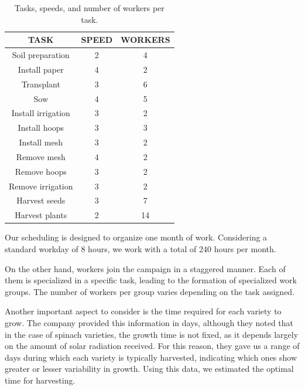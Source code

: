  \begin{table}[ht!]
    \centering
    \begin{minipage}{0.48\textwidth}
        \centering
        \begin{tabular}{|c|c|c|}
            \hline
            \rowcolor{gray!30} \textbf{\textcolor{grey3}{TASK}} & \textbf{\textcolor{grey3}{SPEED}} &  \textbf{\textcolor{grey3}{WORKERS}}\\\hline 
            \hline
            Soil preparation   & 2 & 4 \\ \hline
            Install paper      & 4 & 2\\ \hline
            Transplant         & 3 & 6\\ \hline
            Sow                & 4 & 5\\ \hline
            Install irrigation & 3 & 2 \\ \hline
            Install hoops      & 3 & 3 \\ \hline
            Install mesh       & 3 & 2 \\ \hline
            Remove mesh        & 4 & 2 \\ \hline
            Remove hoops       & 3 & 2 \\ \hline
            Remove irrigation  & 3 & 2 \\ \hline
            Harvest seeds      & 3 & 7 \\ \hline
            Harvest plants     & 2 & 14 \\ 
            \hline
        \end{tabular}
        \caption{Tasks, speeds, and number of workers per task.}
        \label{tab:tareas}
    \end{minipage}
    \hfill
\end{table}
Our scheduling is designed to organize one month of work. Considering a standard workday of 8 hours,  
we work with a total of 240 hours per month.

On the other hand, workers join the campaign in a staggered manner. Each of them is specialized in a specific task,  
leading to the formation of specialized work groups.  
The number of workers per group varies depending on the task assigned.

Another important aspect to consider is the time required for each variety to grow. The company provided this information in days,  
although they noted that in the case of spinach varieties, the growth time is not fixed, as it depends largely on the amount of solar radiation received.  
For this reason, they gave us a range of days during which each variety is typically harvested, indicating which ones show greater or lesser variability in growth.  
Using this data, we estimated the optimal time for harvesting.  

